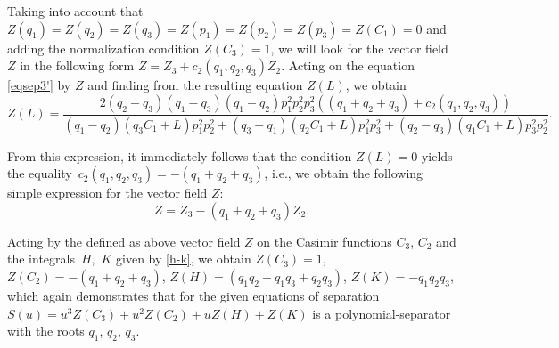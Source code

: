 \documentclass[10pt,a4paper]{amsart}
\numberwithin{equation}{section}
\begin{document}
Taking into account that
$
Z(q_1)=Z(q_2)=Z(q_3)=Z(p_1)=Z(p_2)=Z(p_3)= Z(C_1)=0
$
and adding the normalization condition $Z(C_3)=1$, we will look for the vector field $Z$ in the following form
$
Z=Z_3+c_2(q_1,q_2,q_3) Z_2$.
Acting on the equation \eqref{eqsep3'} by $Z$ and finding from the resulting equation $Z(L)$, we obtain
\begin{equation*}
Z(L)= \frac{2 (q_2-q_3)(q_1-q_3)(q_1-q_2) p_1^2p_2^2p_3^2((q_1+q_2+q_3)+c_2(q_1,q_2,q_3))}{ (q_1-q_2)(q_3C_1+L)p_1^2 p_2^2 +(q_3-q_1)(q_2C_1+L) p_1^2 p_3^2+(q_2-q_3)(q_1C_1+L)p_3^2p_2^2 }.
\end{equation*}

From this expression, it immediately follows that the condition $Z(L)=0$ yields the equality~${c_2(q_1,q_2,q_3)=-(q_1+q_2+q_3)}$, i.e.,
we obtain the following simple expression for the vector field $Z$:
\[
Z=Z_3-(q_1+q_2+q_3) Z_2.
\]


Acting by the defined as above vector field $Z$ on the Casimir functions $C_3$, $C_2$ and the integrals~$H$,~$K$ given by \eqref{h-k}, we obtain
$
Z(C_3)=1$, $ Z(C_2)=-(q_1+q_2+q_3)$, $ Z(H)= (q_1q_2+q_1q_3+q_2q_3)$, $ Z(K)= -q_1q_2q_3$,
which again demonstrates that for the given equations of separation $S(u)=u^3 Z(C_3)+ u^2 Z(C_2)+u Z(H)+ Z(K)$ is a polynomial-separator with the roots $q_1$, $q_2$, $q_3$.
\end{document}
